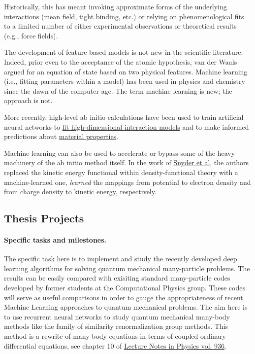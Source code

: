 \documentclass[%
oneside,                 %
final,                   %
10pt]{article}
\begin{document}
Historically, this has meant invoking
approximate forms of the underlying interactions (mean field, tight
binding, etc.) or relying on phenomenological fits to a limited number
of either experimental observations or theoretical results (e.g., force fields). 

The development of feature-based models is not
new in the scientific literature. Indeed, prior even to the acceptance
of the atomic hypothesis, van der Waals argued for an equation of
state based on two physical features. Machine learning (i.e.,
fitting parameters within a model) has been used in physics and
chemistry since the dawn of the computer age. The term machine
learning is new; the approach is not.

More recently, high-level ab initio calculations have been used to
train artificial neural networks to \href{{http://www.sciencedirect.com/science/article/pii/S0927025615007806?via%
models}  and to make informed predictions about \href{{https://www.nature.com/articles/srep40827}}{material properties}. 

Machine learning can also be used to accelerate or bypass some of the
heavy machinery of the ab initio method itself. In the work of \href{{https://journals.aps.org/prl/abstract/10.1103/PhysRevLett.108.253002}}{Snyder et al},  the authors
replaced the kinetic energy functional within density-functional
theory with a machine-learned one, 
\emph{learned} the mappings from potential to electron density and from
charge density to kinetic energy, respectively.

\subsection*{Thesis Projects}



\paragraph{Specific tasks and milestones.}
The specific task here is to implement and study the recently developed
deep learning algorithms for solving quantum mechanical many-particle
problems. The results can  be easily compared with exisiting standard
many-particle codes developed by former students at the Computational
Physics group. These codes will serve as useful comparisons in order
to gauge the appropriateness of recent Machine Learning approaches to
quantum mechanical problems.   The aim here is to use recurrent neural networks to study quantum mechanical many-body methods like the family of similarity renormalization group methods.
This method is a rewrite of many-body equations in terms of coupled ordinary differential equations, see chapter 10 of \href{{https://www.springer.com/gp/book/9783319533353}}{Lecture Notes in Physics vol. 936}. 
\end{document}
